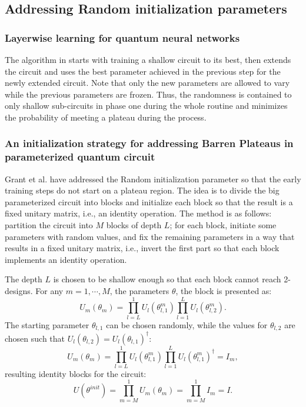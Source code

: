 \subsection{Addressing Random initialization parameters}

\subsubsection{Layerwise learning for quantum neural networks \texorpdfstring{\cite{skolikLayerwiseLearningQuantum2021}}{}}
The algorithm in \cite{skolikLayerwiseLearningQuantum2021} starts with training a shallow circuit to its best, then extends the circuit and uses the best parameter achieved in the previous step for the newly extended circuit. 
Note that only the new parameters are allowed to vary while the previous parameters are frozen.
Thus, the randomness is contained to only shallow sub-circuits in phase one during the whole routine and minimizes the probability of meeting a plateau during the process.


\subsubsection{An initialization strategy for addressing Barren Plateaus in parameterized quantum circuit \texorpdfstring{\cite{grantInitializationStrategyAddressing2019}}{}  }

Grant et al. have addressed the Random initialization parameter so that the early training steps do not start on a plateau region. 
The idea is to divide the big parameterized circuit into blocks and initialize each block so that the result is a fixed unitary matrix, i.e., an identity operation. 
The method is as follows: partition the circuit into $M$ blocks of depth $L$; for each block, initiate some parameters with random values, and fix the remaining parameters in a way that results in a fixed unitary matrix, i.e., invert the first part so that each block implements an identity operation.

The depth $L$ is chosen to be shallow enough so that each block cannot reach 2-designs. For any $m = 1, \cdots, M$, the parameters $\theta$, the block is presented as:
\begin{equation}
    U_m(\theta_m)
    = \prod_{l=L}^1 U_l(\theta_{l,1}^m) \prod_{l=1}^L U_l(\theta_{l,2}^m).
\end{equation}
The starting parameter $\theta_{l,1}$ can be chosen randomly, while the values for $\theta_{l,2}$ are chosen such that $U_l(\theta_{l,2}) = U_l(\theta_{l,1})^\dagger$:
\begin{equation}
    U_m(\theta_m)
    = \prod_{l=L}^1 U_l(\theta_{l,1}^m)
    \prod_{l=1}^L U_l(\theta_{l,1}^m)^\dagger
    = I_m,
\end{equation}
resulting identity blocks for the circuit:
\begin{equation}
    U(\theta^{init})
    = \prod_{m=M}^1 U_m(\theta_m)
    = \prod_{m=M}^1 I_m
    = I.
\end{equation}